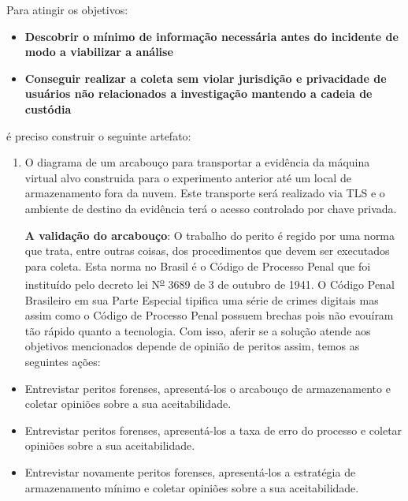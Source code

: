 \documentclass[12pt,				%
	openright,			%
	oneside,			%
	a4paper,			%
	english,			%
	brazil				%
	]{abntex2}
\begin{document}
\begin{flushleft}Para atingir os objetivos: \end{flushleft} 

\begin{itemize}
 \item \textbf{Descobrir o mínimo de informação necessária antes do incidente de modo a viabilizar a análise}
 \item \textbf{Conseguir realizar a coleta sem violar jurisdição e privacidade de usuários não relacionados a investigação mantendo a cadeia de custódia} 
\end{itemize}

\begin{flushleft}é preciso construir o seguinte artefato:\end{flushleft}

\begin{enumerate}

\item O diagrama de um arcabouço para transportar a evidência da máquina virtual alvo construida para o experimento anterior até um local de armazenamento fora da nuvem. Este 
transporte será realizado via TLS e o ambiente de destino da evidência terá o acesso controlado por chave privada.

\textbf{A validação do arcabouço}: O trabalho do perito é regido por uma norma que trata, entre outras coisas, dos procedimentos que devem ser executados para coleta. Esta norma no Brasil é o 
Código de Processo Penal que foi instituído pelo decreto lei N\textsuperscript{\underline{o}} 3689 de 3 de outubro de 1941. O Código Penal Brasileiro em sua Parte Especial 
tipifica uma série de crimes digitais mas assim como o Código de Processo Penal possuem brechas \cite{Do2014} pois não evouíram tão rápido quanto a tecnologia. Com isso, 
aferir se a solução atende aos objetivos mencionados depende de opinião de peritos assim, temos as seguintes ações:

\end{enumerate}

\begin{itemize}

\item Entrevistar peritos forenses, apresentá-los o arcabouço de armazenamento e coletar opiniões sobre a sua aceitabilidade.

\item Entrevistar peritos forenses, apresentá-los a taxa de erro do processo e coletar opiniões sobre a sua aceitabilidade.

\item Entrevistar novamente peritos forenses, apresentá-los a estratégia de armazenamento mínimo e coletar opiniões sobre a sua aceitabilidade. 

\end{itemize}
\end{document}
